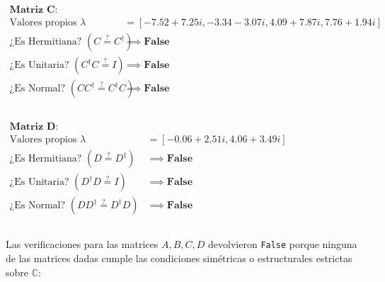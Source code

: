 \documentclass[11pt]{article}
\begin{document}
    
    \begin{Verbatim}[commandchars=\\\{\}]

    \end{Verbatim}

    $\displaystyle 
    \begin{aligned}
    \mathbf{\text{Matriz } C:} &\\[0.3em]
    \text{Valores propios } \lambda &= \left[ -7.52 + 7.25i, -3.34 - 3.07i, 4.09 + 7.87i, 7.76 + 1.94i \right] \\[0.2em]
    \text{¿Es Hermitiana? } (C \stackrel{?}{=} C^\dagger) &\implies \mathbf{False} \\[0.2em]
    \text{¿Es Unitaria? } (C^\dagger C \stackrel{?}{=} I) &\implies \mathbf{False} \\[0.2em]
    \text{¿Es Normal? } (CC^\dagger \stackrel{?}{=} C^\dagger C) &\implies \mathbf{False}
    \end{aligned}
    $

    
    \begin{Verbatim}[commandchars=\\\{\}]

    \end{Verbatim}

    $\displaystyle 
    \begin{aligned}
    \mathbf{\text{Matriz } D:} &\\[0.3em]
    \text{Valores propios } \lambda &= \left[ -0.06 + 2.51i, 4.06 + 3.49i \right] \\[0.2em]
    \text{¿Es Hermitiana? } (D \stackrel{?}{=} D^\dagger) &\implies \mathbf{False} \\[0.2em]
    \text{¿Es Unitaria? } (D^\dagger D \stackrel{?}{=} I) &\implies \mathbf{False} \\[0.2em]
    \text{¿Es Normal? } (DD^\dagger \stackrel{?}{=} D^\dagger D) &\implies \mathbf{False}
    \end{aligned}
    $

    
    \begin{Verbatim}[commandchars=\\\{\}]

    \end{Verbatim}

    Las verificaciones para las matrices \(A,B,C,D\) devolvieron
\texttt{False} porque ninguna de las matrices dadas cumple las
condiciones simétricas o estructurales estrictas sobre \(\mathbb{C}\):
\end{document}
